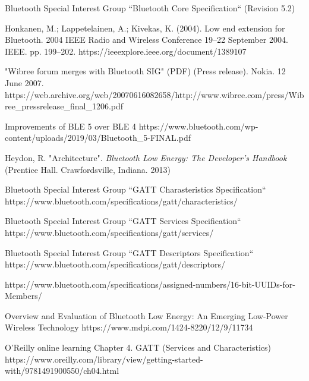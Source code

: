 \documentclass[catalan,final]{setup/eetac_tfc_pfc}
\begin{document}
\cleardoublepage
{}
\begin{thebibliography}{2}


Bluetooth Special Interest Group
``Bluetooth Core Specification``
(Revision 5.2)

Honkanen, M.; Lappetelainen, A.; Kivekas, K. (2004). Low end extension for Bluetooth. 2004 IEEE Radio and Wireless Conference 19–22 September 2004. IEEE. pp. 199–202. https://ieeexplore.ieee.org/document/1389107
 
"Wibree forum merges with Bluetooth SIG" (PDF) (Press release). Nokia. 12 June 2007.
https://web.archive.org/web/20070616082658/http://www.wibree.com/press/Wibree\_pressrelease\_final\_1206.pdf

Improvements of BLE 5 over BLE 4
https://www.bluetooth.com/wp-content/uploads/2019/03/Bluetooth\_5-FINAL.pdf

Heydon, R. "Architecture". {\it Bluetooth Low Energy: The Developer's Handbook}
(Prentice Hall. Crawfordsville, Indiana. 2013)

Bluetooth Special Interest Group
``GATT Charasteristics Specification``
https://www.bluetooth.com/specifications/gatt/characteristics/

Bluetooth Special Interest Group
``GATT Services Specification``
https://www.bluetooth.com/specifications/gatt/services/

Bluetooth Special Interest Group
``GATT Descriptors Specification``
https://www.bluetooth.com/specifications/gatt/descriptors/

https://www.bluetooth.com/specifications/assigned-numbers/16-bit-UUIDs-for-Members/

Overview and Evaluation of Bluetooth Low Energy: An Emerging Low-Power Wireless Technology
https://www.mdpi.com/1424-8220/12/9/11734

O’Reilly online learning
Chapter 4. GATT (Services and Characteristics)
https://www.oreilly.com/library/view/getting-started-with/9781491900550/ch04.html


\end{thebibliography}
\end{document}
